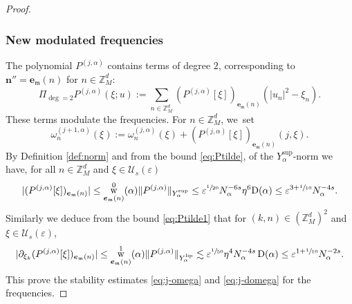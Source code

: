 \documentclass[10pt,a4paper]{amsart}
\DeclareMathOperator{\rw}{w}
\theoremstyle{plain}
\theoremstyle{definition}
\newcommand{\nb}{{\boldsymbol n}}
\newcommand{\Z}{\mathbb{Z}}
\newcommand{\1}{\mathbf{1}}
\newcommand{\Ysup}[1]{Y_{#1}^{\mathrm{sup}}}
\newcommand{\Ylip}[1]{Y_{#1}^{\mathrm{lip}}}
\let\epsilon\varepsilon
\begin{document}
\begin{proof}
\subsubsection*{New modulated frequencies} The polynomial $P^{(j,\alpha)}$ contains terms of degree $2$, corresponding to $\nb''=\boldsymbol{e}_{\mathfrak{m}}(n)$ for $n\in\Z_{M}^{d}$:
\[
\Pi_{\deg=2}P^{(j,\alpha)}(\xi;u)
:= \sum_{n\in\Z_{M}^{d}}(P^{(j,\alpha)}[\xi])_{\boldsymbol{e}_{\mathfrak{m}}(n)}(|u_n|^{2}-\xi_{n}).
\]
These terms modulate the frequencies. For $n\in\Z_{M}^{d}$, we~set
\[
\omega_{n}^{(j+1,\alpha)}(\xi)
:= \omega_{n}^{(j,\alpha)}(\xi)
+ (P^{(j,\alpha)}[\xi])_{\boldsymbol{e}_{\mathfrak{m}}(n)}(j,\xi).
\]
By Definition \ref{def:norm} and from the bound \eqref{eq:Ptilde}, of the $\Ysup{\alpha}$-norm we have, for all $n\in\Z_{M}^{d}$ and $\xi\in\mathcal{U}_{s}(\epsilon)$
\[
|(P^{(j,\alpha)}[\xi])_{\boldsymbol{e}_{\mathfrak{m}}(n)}|
\leq \rw_{\boldsymbol{e}_{\mathfrak{m}}(n)}^{0}(\alpha)\|P^{(j,\alpha)}\|_{\Ysup{\alpha}}
\leq \epsilon^{\sfrac{1}{20}}
N_{\alpha}^{-6s}\eta^{6}\mathrm{D}(\alpha)
\leq \epsilon^{3+\sfrac{1}{10}}N_{\alpha}^{-4s}.
\]
Similarly we deduce from the bound \eqref{eq:Ptilde1} that for $(k,n)\in(\Z_{M}^{d})^{2}$ and $\xi\in\mathcal{U}_{s}(\epsilon)$,
\[
|\partial_{\xi_{k}} (P^{(j,\alpha)}[\xi])_{\boldsymbol{e}_{\mathfrak{m}}(n)}|
\leq
\rw_{\boldsymbol{e}_{\mathfrak{m}}(n)}^{1}(\alpha)
\|P^{(j,\alpha)}\|_{\Ylip{\alpha}}
\lesssim \epsilon^{\sfrac{1}{50}}\eta^{4}N_{\alpha}^{-4s}\operatorname{D}(\alpha)
\leq
\epsilon^{1+\sfrac{1}{10}}N_{\alpha}^{-2s}.
\]
This prove the stability estimates \eqref{eq:j-omega} and \eqref{eq:j-domega} for the frequencies.


\end{proof}
\end{document}

